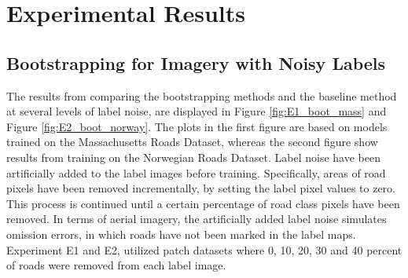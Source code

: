 \section{Experimental Results}
\label{sec:experimentalResults}
\subsection{Bootstrapping for Imagery with Noisy Labels}
\label{sec:results_bootstrapping}

The results from comparing the bootstrapping methods and the baseline method at several levels of label noise, are displayed in Figure \ref{fig:E1_boot_mass} and Figure \ref{fig:E2_boot_norway}. The plots in the first figure are based on models trained on the Massachusetts Roads Dataset, whereas the second figure show results from training on the Norwegian Roads Dataset. Label noise have been artificially added to the label images before training. Specifically, areas of road pixels have been removed incrementally, by setting the label pixel values to zero. This process is continued until a certain percentage of road class pixels have been removed. In terms of aerial imagery, the artificially added label noise simulates omission errors, in which roads have not been marked in the label maps. Experiment E1 and E2, utilized patch datasets where 0, 10, 20, 30 and 40 percent of roads were removed from each label image.\\


